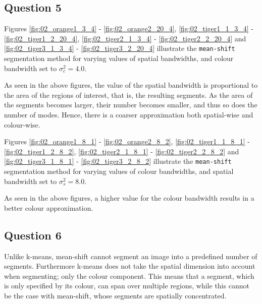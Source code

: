 \subsection{Question 5}

Figures \ref{fig:02_orange1_3_4} - \ref{fig:02_orange2_20_4},
\ref{fig:02_tiger1_1_3_4} - \ref{fig:02_tiger1_2_20_4},
\ref{fig:02_tiger2_1_3_4} - \ref{fig:02_tiger2_2_20_4} and
\ref{fig:02_tiger3_1_3_4} - \ref{fig:02_tiger3_2_20_4} illustrate
the \texttt{mean-shift} segmentation method for varying values of spatial
bandwidths, and colour bandwidth set to $\sigma_c^2 = 4.0$.

As seen in the above figures, the value of the spatial bandwidth is proportional
to the area of the regions of interest, that is, the resulting segments. As
the area of the segments becomes larger, their number becomes smaller, and thus
so does the number of modes. Hence, there is a coarser approximation both
spatial-wise and colour-wise.

Figures \ref{fig:02_orange1_8_1} - \ref{fig:02_orange2_8_2},
\ref{fig:02_tiger1_1_8_1} - \ref{fig:02_tiger1_2_8_2},
\ref{fig:02_tiger2_1_8_1} - \ref{fig:02_tiger2_2_8_2} and
\ref{fig:02_tiger3_1_8_1} - \ref{fig:02_tiger3_2_8_2} illustrate
the \texttt{mean-shift} segmentation method for varying values of colour
bandwidths, and spatial bandwidth set to $\sigma_s^2 = 8.0$.

As seen in the above figures, a higher value for the colour bandwidth results
in a better colour approximation.


\subsection{Question 6}

Unlike k-means, mean-shift cannot segment an image into a predefined number of
segments. Furthermore k-means does not take the spatial dimension into account
when segmenting; only the colour component. This means that a segment, which is
only specified by its colour, can span over multiple regions, while this
cannot be the case with mean-shift, whose segments are spatially concentrated.

